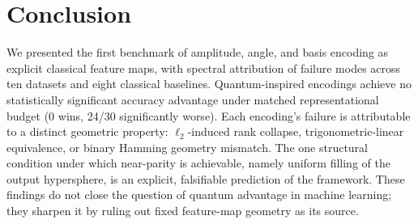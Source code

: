 \section{Conclusion}
\label{sec:conclusion}

We presented the first benchmark of amplitude, angle, and basis encoding as
explicit classical feature maps, with spectral attribution of failure modes
across ten datasets and eight classical baselines.
Quantum-inspired encodings achieve no statistically significant accuracy
advantage under matched representational budget (0 wins, 24/30 significantly
worse).
Each encoding's failure is attributable to a distinct geometric property:
$\ell_2$-induced rank collapse, trigonometric-linear equivalence, or binary
Hamming geometry mismatch.
The one structural condition under which near-parity is achievable, namely
uniform filling of the output hypersphere, is an explicit, falsifiable
prediction of the framework.
These findings do not close the question of quantum advantage in machine
learning; they sharpen it by ruling out fixed feature-map geometry as its
source.
